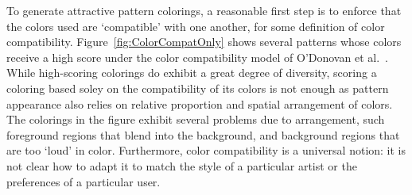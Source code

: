To generate attractive pattern colorings, a reasonable first step is to enforce that the colors used are `compatible' with one another, for some definition of color compatibility. Figure~\ref{fig:ColorCompatOnly} shows several patterns whose colors receive a high score under the color compatibility model of O'Donovan et al.~. While high-scoring colorings do exhibit a great degree of diversity, scoring a coloring based soley on the compatibility of its colors is not enough as pattern appearance also relies on relative proportion and spatial arrangement of colors. The colorings in the figure exhibit several problems due to arrangement, such foreground regions that blend into the background, and background regions that are too `loud' in color. Furthermore, color compatibility is a universal notion: it is not clear how to adapt it to match the style of a particular artist or the preferences of a particular user.



